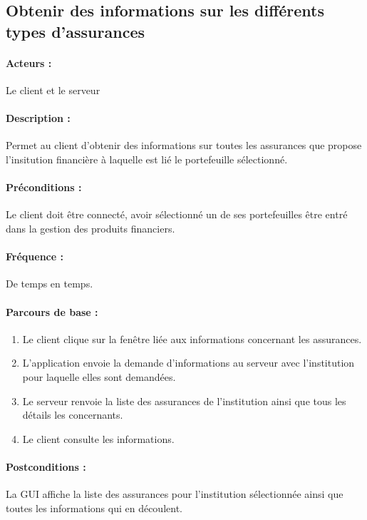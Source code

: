 \documentclass[../annexe.tex]{subfiles}
\begin{document}
\newpage

\subsection{Obtenir des informations sur les différents types 
d'assurances}

\paragraph{Acteurs :} Le client et le serveur 

\paragraph{Description :} Permet au client d'obtenir des informations sur toutes les assurances que propose l'insitution financière à laquelle est lié le portefeuille sélectionné.

\paragraph{Préconditions :} Le client doit être connecté, avoir sélectionné un  de ses portefeuilles être entré dans la gestion des produits financiers.

\paragraph{Fréquence :} De temps en temps.

\paragraph{Parcours de base :}

	\begin{enumerate}
		\item Le client clique sur la fenêtre liée aux informations concernant les assurances.
		\item L'application envoie la demande d'informations au serveur avec l'institution pour laquelle elles sont demandées.
		\item Le serveur renvoie la liste des assurances de l'institution ainsi que tous les détails les concernants.
		\item Le client consulte les informations.
	\end{enumerate}
	
\paragraph{Postconditions :} La GUI affiche la liste des assurances pour l'institution sélectionnée ainsi que toutes les informations qui en découlent.
\end{document}
